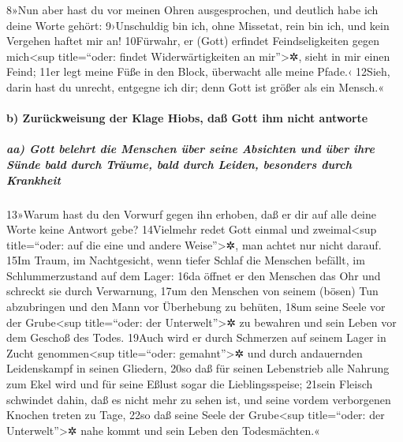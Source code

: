 8»Nun aber hast du vor meinen Ohren ausgesprochen, und deutlich habe ich
deine Worte gehört: 9›Unschuldig bin ich, ohne Missetat, rein bin ich,
und kein Vergehen haftet mir an! 10Fürwahr, er (Gott) erfindet
Feindseligkeiten gegen mich\textless sup title=``oder: findet
Widerwärtigkeiten an mir''\textgreater✲, sieht in mir einen Feind; 11er
legt meine Füße in den Block, überwacht alle meine Pfade.‹ 12Sieh, darin
hast du unrecht, entgegne ich dir; denn Gott ist größer als ein Mensch.«

\hypertarget{b-zuruxfcckweisung-der-klage-hiobs-dauxdf-gott-ihm-nicht-antworte}{%
\paragraph{b) Zurückweisung der Klage Hiobs, daß Gott ihm nicht
antworte}\label{b-zuruxfcckweisung-der-klage-hiobs-dauxdf-gott-ihm-nicht-antworte}}

\hypertarget{aa-gott-belehrt-die-menschen-uxfcber-seine-absichten-und-uxfcber-ihre-suxfcnde-bald-durch-truxe4ume-bald-durch-leiden-besonders-durch-krankheit}{%
\subparagraph{aa) Gott belehrt die Menschen über seine Absichten und
über ihre Sünde bald durch Träume, bald durch Leiden, besonders durch
Krankheit}\label{aa-gott-belehrt-die-menschen-uxfcber-seine-absichten-und-uxfcber-ihre-suxfcnde-bald-durch-truxe4ume-bald-durch-leiden-besonders-durch-krankheit}}

13»Warum hast du den Vorwurf gegen ihn erhoben, daß er dir auf alle
deine Worte keine Antwort gebe? 14Vielmehr redet Gott einmal und
zweimal\textless sup title=``oder: auf die eine und andere
Weise''\textgreater✲, man achtet nur nicht darauf. 15Im Traum, im
Nachtgesicht, wenn tiefer Schlaf die Menschen befällt, im
Schlummerzustand auf dem Lager: 16da öffnet er den Menschen das Ohr und
schreckt sie durch Verwarnung, 17um den Menschen von seinem (bösen) Tun
abzubringen und den Mann vor Überhebung zu behüten, 18um seine Seele vor
der Grube\textless sup title=``oder: der Unterwelt''\textgreater✲ zu
bewahren und sein Leben vor dem Geschoß des Todes. 19Auch wird er durch
Schmerzen auf seinem Lager in Zucht genommen\textless sup title=``oder:
gemahnt''\textgreater✲ und durch andauernden Leidenskampf in seinen
Gliedern, 20so daß für seinen Lebenstrieb alle Nahrung zum Ekel wird und
für seine Eßlust sogar die Lieblingsspeise; 21sein Fleisch schwindet
dahin, daß es nicht mehr zu sehen ist, und seine vordem verborgenen
Knochen treten zu Tage, 22so daß seine Seele der Grube\textless sup
title=``oder: der Unterwelt''\textgreater✲ nahe kommt und sein Leben den
Todesmächten.«

